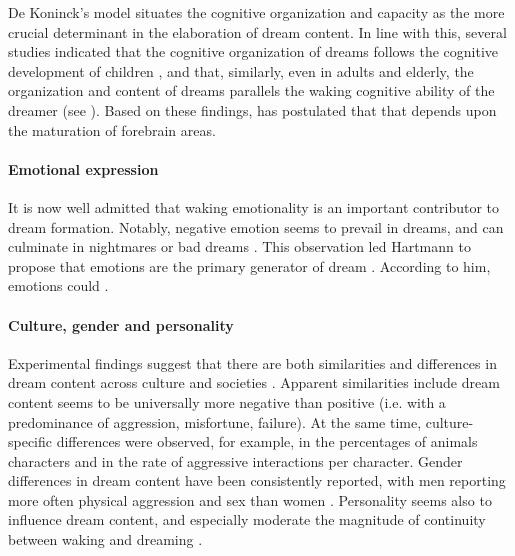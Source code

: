 De Koninck's model situates the cognitive organization and capacity as the more crucial determinant in the elaboration of dream content. In line with this, several studies indicated that the cognitive organization of dreams follows the cognitive development of children \citep{foulkes_childrens_1982, foulkes_rem_1990}, and that, similarly, even in adults and elderly, the organization and content of dreams parallels the waking cognitive ability of the dreamer (see \citealp{cavallero_dreaming_1993}). Based on these findings, \citet{domhoff_new_2001} has postulated that  that depends upon the maturation of forebrain areas.

\paragraph{Emotional expression}

It is now well admitted that waking emotionality is an important contributor to dream formation. Notably, negative emotion seems to prevail in dreams, and can culminate in nightmares or bad dreams \citep{zadra_nightmares_2000, zadra_variety_2006}. This observation led Hartmann to propose that emotions are the primary generator of dream \citep{hartmann_nature_2007, hartmann_central_2008}. According to him, emotions could  \citep{de_koninck_sleep_2012}.

\paragraph{Culture, gender and personality}

Experimental findings suggest that there are both similarities and differences in dream content across culture and societies \citep{domhoff_similarities_2008}. Apparent similarities include dream content seems to be universally more negative than positive (i.e. with a predominance of aggression, misfortune, failure). At the same time, culture-specific differences were observed, for example, in the percentages of animals characters and in the rate of aggressive interactions per character. Gender differences in dream content have been consistently reported, with men reporting more often physical aggression and sex than women \citep{nielsen_typical_2003, schredl_typical_2004}. Personality seems also to influence dream content, and especially moderate the magnitude of continuity between waking and dreaming \citep{schredl_dreaming_1996, schredl_characteristics_2010}.

